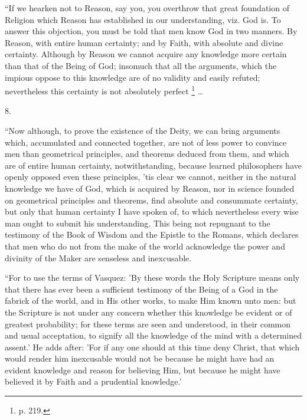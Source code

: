 ``If we hearken not to Reason, say you, you overthrow that
great foundation of Religion which Reason has established in our
understanding, viz. God is. To answer this objection, you must be told
that men know God in two manners. By Reason, with entire human
certainty; and by Faith, with absolute and divine certainty. Although
by Reason we cannot acquire any knowledge more certain than that of
the Being of God; insomuch that all the arguments, which the impious
oppose to this knowledge are of no validity and easily refuted;
nevertheless this certainty is not absolutely perfect \footnote{p. 219.} …

8.

``Now although, to prove the existence of the Deity, we can
bring arguments which, accumulated and connected together, are not of
less power to convince men than geometrical principles, and theorems
deduced from them, and which are of entire human certainty,
notwithstanding, because learned philosophers have openly opposed even
these principles, 'tis clear we cannot, neither in the natural
knowledge we have of God, which is acquired by Reason, nor in science
founded on geometrical principles and theorems, find absolute and
consummate certainty, but only that human certainty I have spoken of,
to which nevertheless every wise man ought to submit his
understanding. This being not repugnant to the testimony of the Book
of Wisdom and the Epistle to the Romans, which declares that men who
do not from the make of the world acknowledge the power and divinity
of the Maker are senseless and inexcusable.

``For to use the terms of Vasquez: 'By these words the Holy
Scripture means only that there has ever been a sufficient testimony
of the Being of a God in the fabrick of the world, and in His other
works, to make Him known unto men: but the Scripture is not under any
concern whether this knowledge be evident or of greatest probability;
for these terms are seen and understood, in their common and usual
acceptation, to signify all the knowledge of the mind with a
determined assent.' He adds after: 'For if any one should at this time
deny Christ, that which would render him inexcusable would not be
because he might have had an evident knowledge and reason for
believing Him, but because he might have believed it by Faith and a
prudential knowledge.'

